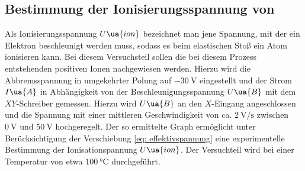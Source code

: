\subsection{Bestimmung der Ionisierungsspannung von }
Als Ionisierungsspannung $U\ua{ion}$ bezeichnet man jene Spannung, mit der ein Elektron beschleunigt werden
muss, sodass es beim elastischen Stoß ein Atom ionisieren kann. Bei diesem Versuchsteil sollen die bei diesem
Prozess entstehenden positiven Ionen nachgewiesen werden. Hierzu wird die Abbremsspannung in umgekehrter Polung
auf $\SI{-30}{\volt}$ eingestellt und der Strom $I\ua{A}$ in Abhängigkeit von der Beschleunigungsspannung $U\ua{B}$
mit dem $XY$-Schreiber gemessen. Hierzu wird $U\ua{B}$ an den $X$-Eingang angeschlossen und die Spannung mit einer %
mittleren Geschwindigkeit von ca. $\SI{2}{\volt \per\second}$ zwischen $\SI{0}{\volt}$ und $\SI{50}{\volt}$ hochgeregelt.
Der so ermittelte Graph ermöglicht unter Berücksichtigung der Verschiebung \ref{eq: effektivspannung} eine
experimentelle Bestimmung der Ionisationspannung $U\ua{ion}$. Der Versuchteil wird bei einer Temperatur von etwa $\SI{100}{\celsius}$
durchgeführt.
